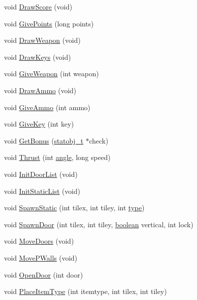 \begin{DoxyCompactItemize}
void \hyperlink{WL__DEF_8H_a5adcab0b538029aa93ac79c08adc129c}{DrawScore} (void)
\item 
void \hyperlink{WL__DEF_8H_aced31f0edae6f9496d6d56942f318aba}{GivePoints} (long points)
\item 
void \hyperlink{WL__DEF_8H_a0b198c7d98710fffb49091dae4fc6122}{DrawWeapon} (void)
\item 
void \hyperlink{WL__DEF_8H_af3f3b9f79b56cd9e8e740e2ffd7522ab}{DrawKeys} (void)
\item 
void \hyperlink{WL__DEF_8H_aabcbbb80ba8c11b87f33bd15707410c6}{GiveWeapon} (int weapon)
\item 
void \hyperlink{WL__DEF_8H_a4fcb6f04271d5008c0cb4c71fd02dcfe}{DrawAmmo} (void)
\item 
void \hyperlink{WL__DEF_8H_af6a9d18983cf35f34e0cf72dc1af934e}{GiveAmmo} (int ammo)
\item 
void \hyperlink{WL__DEF_8H_ac83a75229c96c115e1391140ffe2de8a}{GiveKey} (int key)
\item 
void \hyperlink{WL__DEF_8H_ae541a99035c0697e4b819dbe96f16a6a}{GetBonus} (\hyperlink{structstatstruct}{statobj\_\-t} $\ast$check)
\item 
void \hyperlink{WL__DEF_8H_ad49e33617f0da8e8ae3f643172eb39da}{Thrust} (int \hyperlink{WL__DRAW_8C_a63177970cacb40efba67ce501ea89210}{angle}, long speed)
\item 
void \hyperlink{WL__DEF_8H_a7cafaabc4f28713aed54140af4bf7821}{InitDoorList} (void)
\item 
void \hyperlink{WL__DEF_8H_a94a48438cf3ce2f07949db5b643a5c14}{InitStaticList} (void)
\item 
void \hyperlink{WL__DEF_8H_ac133172594077a3babdc842789685053}{SpawnStatic} (int tilex, int tiley, int \hyperlink{WL__ACT1_8C_ac6913ebc2a188919d185cadc155a48cd}{type})
\item 
void \hyperlink{WL__DEF_8H_a885eeed9c39cfff1e74bcde145baf296}{SpawnDoor} (int tilex, int tiley, \hyperlink{ID__HEAD_8H_a7c6368b321bd9acd0149b030bb8275ed}{boolean} vertical, int lock)
\item 
void \hyperlink{WL__DEF_8H_a1dc87c7ff6adc5fc586c9abe07ddf5c8}{MoveDoors} (void)
\item 
void \hyperlink{WL__DEF_8H_ab2085ab9cc836de93ca4c35fc4d0e677}{MovePWalls} (void)
\item 
void \hyperlink{WL__DEF_8H_a630648edf8f675df38eb0b5b8abc6a9f}{OpenDoor} (int door)
\item 
void \hyperlink{WL__DEF_8H_ab8961c07d2e3d33e51fc815f44e47e92}{PlaceItemType} (int itemtype, int tilex, int tiley)

\end{DoxyCompactItemize}
